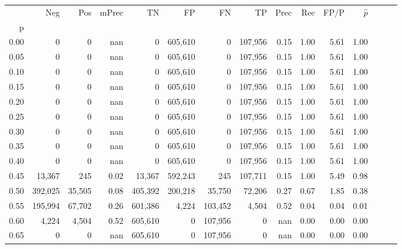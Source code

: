 \begin{tabular}{rrrrrrrrrrrrrrr}
\toprule
{} &      Neg &     Pos & mPrec &       TN &       FP &       FN &       TP &  Prec &   Rec &  FP/P & $\hat{p}$ \\
p    &          &         &       &          &          &          &          &       &       &       &           \\
\midrule
0.00 &        0 &       0 &   nan &        0 &  605,610 &        0 &  107,956 &  0.15 &  1.00 &  5.61 &      1.00 \\
0.05 &        0 &       0 &   nan &        0 &  605,610 &        0 &  107,956 &  0.15 &  1.00 &  5.61 &      1.00 \\
0.10 &        0 &       0 &   nan &        0 &  605,610 &        0 &  107,956 &  0.15 &  1.00 &  5.61 &      1.00 \\
0.15 &        0 &       0 &   nan &        0 &  605,610 &        0 &  107,956 &  0.15 &  1.00 &  5.61 &      1.00 \\
0.20 &        0 &       0 &   nan &        0 &  605,610 &        0 &  107,956 &  0.15 &  1.00 &  5.61 &      1.00 \\
0.25 &        0 &       0 &   nan &        0 &  605,610 &        0 &  107,956 &  0.15 &  1.00 &  5.61 &      1.00 \\
0.30 &        0 &       0 &   nan &        0 &  605,610 &        0 &  107,956 &  0.15 &  1.00 &  5.61 &      1.00 \\
0.35 &        0 &       0 &   nan &        0 &  605,610 &        0 &  107,956 &  0.15 &  1.00 &  5.61 &      1.00 \\
0.40 &        0 &       0 &   nan &        0 &  605,610 &        0 &  107,956 &  0.15 &  1.00 &  5.61 &      1.00 \\
0.45 &   13,367 &     245 &  0.02 &   13,367 &  592,243 &      245 &  107,711 &  0.15 &  1.00 &  5.49 &      0.98 \\
0.50 &  392,025 &  35,505 &  0.08 &  405,392 &  200,218 &   35,750 &   72,206 &  0.27 &  0.67 &  1.85 &      0.38 \\
0.55 &  195,994 &  67,702 &  0.26 &  601,386 &    4,224 &  103,452 &    4,504 &  0.52 &  0.04 &  0.04 &      0.01 \\
0.60 &    4,224 &   4,504 &  0.52 &  605,610 &        0 &  107,956 &        0 &   nan &  0.00 &  0.00 &      0.00 \\
0.65 &        0 &       0 &   nan &  605,610 &        0 &  107,956 &        0 &   nan &  0.00 &  0.00 &      0.00 \\

\end{tabular}
